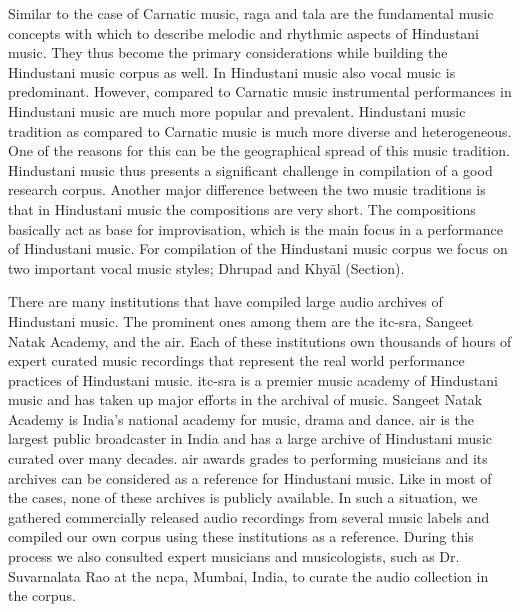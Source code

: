 Similar to the case of Carnatic music, \gls{raga} and \gls{tala} are the fundamental music concepts with which to describe melodic and rhythmic aspects of Hindustani music. They thus become the primary considerations while building the Hindustani music corpus as well. In Hindustani music also vocal music is predominant. However, compared to Carnatic music instrumental performances in Hindustani music are much more popular and prevalent. Hindustani music tradition as compared to Carnatic music is much more diverse and heterogeneous. One of the reasons for this can be the geographical spread of this music tradition. Hindustani music thus presents a significant challenge in compilation of a good research corpus. Another major difference between the two music traditions is that in Hindustani music the compositions are very short. The compositions basically act as base for improvisation, which is the main focus in a performance of Hindustani music. For compilation of the Hindustani music corpus we focus on two important vocal music styles; Dhrupad and Khy\={a}l (Section). %

There are many institutions that have compiled large audio archives of Hindustani music. The prominent ones among them are the \gls{itc-sra}, Sangeet Natak Academy, and the \gls{air}. Each of these institutions own thousands of hours of expert curated music recordings that represent the real world performance practices of Hindustani music. \gls{itc-sra} is a premier music academy of Hindustani music and has taken up major efforts in the archival of music. Sangeet Natak Academy is India’s national academy for music, drama and dance. \gls{air} is the largest public broadcaster in India and has a large archive of Hindustani music curated over many decades. \gls{air} awards grades to performing musicians and its archives can be considered as a reference for Hindustani music. Like in most of the cases, none of these archives is publicly available. In such a situation, we gathered commercially released audio recordings from several music labels and compiled our own corpus using these institutions as a reference. During this process we also consulted expert musicians and musicologists, such as Dr. Suvarnalata Rao at the \gls{ncpa}, Mumbai, India, to curate the audio collection in the corpus. 

